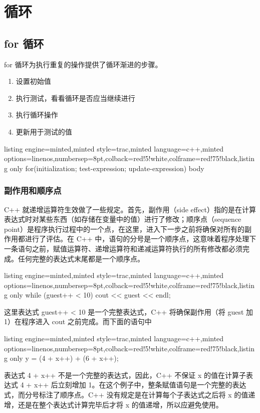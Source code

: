\chapter{循环}
\section{for 循环}
for 循环为执行重复的操作提供了循环渐进的步骤。
\begin{enumerate}
	\item 设置初始值
	\item 执行测试，看看循环是否应当继续进行
	\item 执行循环操作
	\item 更新用于测试的值
\end{enumerate}
\begin{tcblisting}{listing engine=minted,minted style=trac,minted language=c++,minted options={linenos,numbersep=8pt},colback=red!5!white,colframe=red!75!black,listing only}
	for(initialization; test-expression; update-expression)
		body
\end{tcblisting}
\subsection{副作用和顺序点}
C++ 就递增运算符生效做了一些规定。首先，副作用（side effect）指的是在计算表达式时对某些东西（如存储在变量中的值）进行了修改；顺序点（sequence point）是程序执行过程中的一个点，在这里，进入下一步之前将确保对所有的副作用都进行了评估。在 C++ 中，语句的分号是一个顺序点，这意味着程序处理下一条语句之前，赋值运算符、递增运算符和递减运算符执行的所有修改都必须完成。任何完整的表达式末尾都是一个顺序点。
\begin{tcblisting}{listing engine=minted,minted style=trac,minted language=c++,minted options={linenos,numbersep=8pt},colback=red!5!white,colframe=red!75!black,listing only}
	while (guest++ < 10)
		cout << guest << endl;
\end{tcblisting}
这里表达式 guest++ < 10 是一个完整表达式，C++ 将确保副作用（将 guest 加 1）在程序进入 cout 之前完成。而下面的语句中
\begin{tcblisting}{listing engine=minted,minted style=trac,minted language=c++,minted options={linenos,numbersep=8pt},colback=red!5!white,colframe=red!75!black,listing only}
	y = (4 + x++) + (6 + x++);
\end{tcblisting}
表达式 4 + x++ 不是一个完整的表达式，因此，C++ 不保证 x 的值在计算子表达式 4 + x++ 后立刻增加 1。在这个例子中，整条赋值语句是一个完整的表达式，而分号标注了顺序点。C++ 没有规定是在计算每个子表达式之后将 x 的值递增，还是在整个表达式计算完毕后才将 x 的值递增，所以应避免使用。
